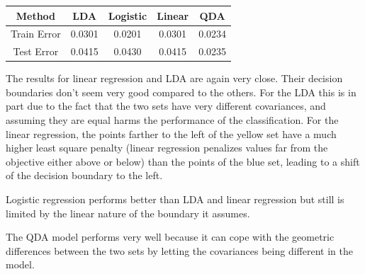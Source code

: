 \documentclass[9pt, oneside]{amsart}   	%
\begin{document}
\hfill
 \begin{minipage}{.45\textwidth}
  \begin{table}[H]
   \centering
    \begin{tabular}{c|cccc}
    Method & LDA & Logistic & Linear & QDA \\
    \hline
    Train Error & 0.0301 & 0.0201 & 0.0301 & 0.0234 \\
    \hline
    Test Error & 0.0415 & 0.0430 & 0.0415 & 0.0235 \\
    \end{tabular}
\end{table}

 \end{minipage}\hfill
 \begin{minipage}{.45\textwidth}
 The results for linear regression and LDA are again very close. Their decision boundaries don't seem very good compared to the others. For the LDA this is in part due to the fact that the two sets have very different covariances, and assuming they are equal harms the performance of the classification. For the linear regression, the points farther to the left of the yellow set have a much higher least square penalty (linear regression penalizes values far from the objective either above or below) than the points of the blue set, leading to a shift of the decision boundary to the left. 
 
 Logistic regression performs better than LDA and linear regression but still is limited by the linear nature of the boundary it assumes.
 
 The QDA model performs very well because it can cope with the geometric differences between the two sets by letting the covariances being different in the model. 
 \end{minipage}\hspace{1cm}
\end{document}
